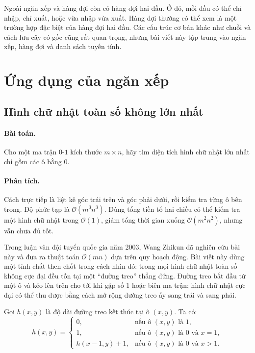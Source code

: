 \documentclass[11pt]{article}
\newcommand{\Oh}{\mathcal{O}}
\newcommand{\matzeroone}{ma trận \(0\)-\(1\)}
\begin{document}
Ngoài ngăn xếp và hàng đợi còn có hàng đợi hai đầu. Ở đó, mỗi đầu có thể chỉ
nhập, chỉ xuất, hoặc vừa nhập vừa xuất. Hàng đợi thường có thể xem là một
trường hợp đặc biệt của hàng đợi hai đầu. Các cấu trúc cơ bản khác như chuỗi
và cách lưu cây có gốc cũng rất quan trọng, nhưng bài viết này tập trung vào
ngăn xếp, hàng đợi và danh sách tuyến tính.

\section{Ứng dụng của ngăn xếp}

\subsection{Hình chữ nhật toàn số không lớn nhất}

\paragraph{Bài toán.}
Cho một \matzeroone{} kích thước \(m\times n\), hãy tìm diện tích hình chữ
nhật lớn nhất chỉ gồm các ô bằng \(0\).

\paragraph{Phân tích.}
Cách trực tiếp là liệt kê góc trái trên và góc phải dưới, rồi kiểm tra từng ô
bên trong. Độ phức tạp là \(\Oh(m^3n^3)\). Dùng tổng tiền tố hai chiều có thể
kiểm tra một hình chữ nhật trong \(\Oh(1)\), giảm tổng thời gian xuống
\(\Oh(m^2n^2)\), nhưng vẫn chưa đủ tốt.

Trong luận văn đội tuyển quốc gia năm 2003, Wang Zhikun đã nghiên cứu bài này
và đưa ra thuật toán \(\Oh(mn)\) dựa trên quy hoạch động. Bài viết này dùng
một tính chất then chốt trong cách nhìn đó: trong mọi hình chữ nhật toàn số
không cực đại đều tồn tại một ``đường treo'' thẳng đứng. Đường treo bắt đầu
từ một ô và kéo lên trên cho tới khi gặp số \(1\) hoặc biên ma trận; hình chữ
nhật cực đại có thể thu được bằng cách mở rộng đường treo ấy sang trái và
sang phải.

Gọi \(h(x,y)\) là độ dài đường treo kết thúc tại ô \((x,y)\). Ta có:
\[
h(x,y)=
\begin{cases}
0, & \text{nếu ô }(x,y)\text{ là }1,\\
1, & \text{nếu ô }(x,y)\text{ là }0\text{ và }x=1,\\
h(x-1,y)+1, & \text{nếu ô }(x,y)\text{ là }0\text{ và }x>1.
\end{cases}
\]
\end{document}
